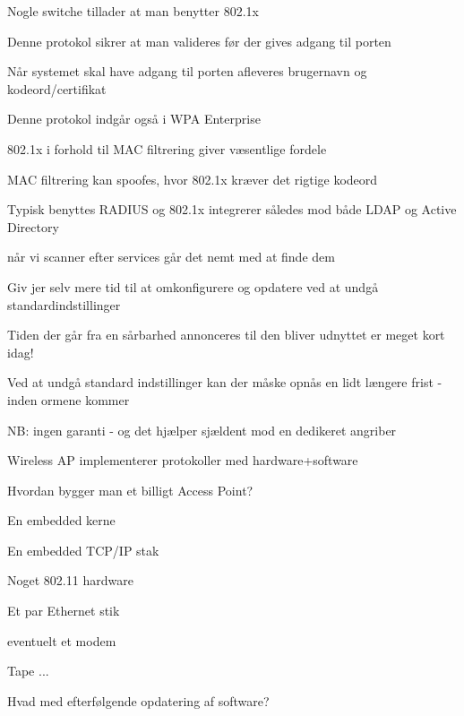 \documentclass[Screen16to9,17pt]{foils}
\begin{document}


\begin{list2}
\item Nogle switche tillader at man benytter 802.1x
\item Denne protokol sikrer at man valideres før der gives adgang til porten
\item Når systemet skal have adgang til porten afleveres brugernavn og kodeord/certifikat
\item Denne protokol indgår også i WPA Enterprise
\end{list2}



\begin{list1}
\item 802.1x i forhold til MAC filtrering giver væsentlige fordele
\item MAC filtrering kan spoofes, hvor 802.1x kræver det rigtige kodeord
\item Typisk benyttes RADIUS og 802.1x integrerer således mod både LDAP og Active Directory
\end{list1}





\begin{list1}
\item når vi scanner efter services går det nemt med at finde dem
\item Giv jer selv mere tid til at omkonfigurere og opdatere ved at undgå standardindstillinger
\item Tiden der går fra en sårbarhed annonceres til den
  bliver udnyttet er meget kort idag!
\item Ved at undgå standard indstillinger kan der
  måske opnås en lidt længere frist - inden ormene kommer
\item NB: ingen garanti - og det hjælper sjældent mod en dedikeret angriber
\end{list1}




\centerline{Wireless AP implementerer protokoller med hardware+software}

\begin{list1}
\item Hvordan bygger man et billigt Access Point?
\begin{list2}
\item En embedded kerne
\item En embedded TCP/IP stak
\item Noget 802.11 hardware
\item Et par Ethernet stik
\item eventuelt et modem
\item Tape ...
\end{list2}
\item Hvad med efterfølgende opdatering af software?
\end{list1}
\end{document}
